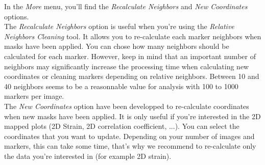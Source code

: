 \indent\indent In the \textit{More} menu, you'll find the \textit{Recalculate Neighbors} and \textit{New Coordinates} options.\\
\newline
\indent The \textit{Recalculate Neighbors} option is useful when you're using the \textit{Relative Neighbors Cleaning} tool. It allows you to re-calculate each marker neighbors when masks have been applied. You can chose how many neighbors should be calculated for each marker. However, keep in mind that an important number of neighbors may significantly increase the processing time when calculating new coordinates or cleaning markers depending on relative neighbors. Between 10 and 40 neighbors seems to be a reasonnable value for analysis with 100 to 1000 markers per image.\\
\newline
\indent The \textit{New Coordinates} option have been developped to re-calculate coordinates when new masks have been applied. It is only useful if you're interested in the 2D mapped plots (2D Strain, 2D correlation coefficient, ...). You can select the coordinates that you want to update. Depending on your number of images and markers, this can take some time, that's why we recommend to re-calculate only the data you're interested in (for example 2D strain).\\
